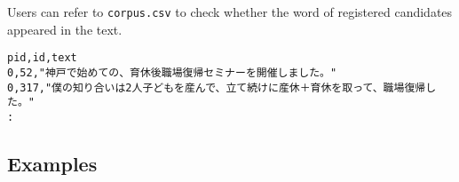 Users can refer to \verb|corpus.csv| to check whether the word of registered candidates appeared in the text.  


\begin{Verbatim}[baselinestretch=0.7,frame=single]
pid,id,text
0,52,"神戸で始めての、育休後職場復帰セミナーを開催しました。"
0,317,"僕の知り合いは2人子どもを産んで、立て続けに産休＋育休を取って、職場復帰した。"
:
\end{Verbatim}




\subsection{Examples}


%

